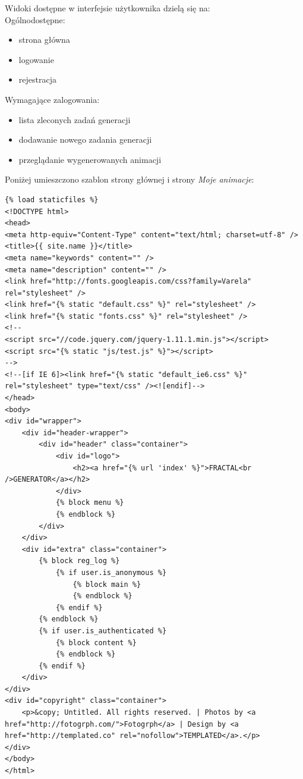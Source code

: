 \documentclass[a4paper]{article}
\begin{document}
Widoki dostępne w interfejsie użytkownika dzielą się na:\\
Ogólnodostępne:
\begin{itemize}
\item strona główna
\item logowanie
\item rejestracja
\end{itemize}
Wymagające zalogowania:
\begin{itemize}
\item lista zleconych zadań generacji
\item dodawanie nowego zadania generacji
\item przeglądanie wygenerowanych animacji
\end{itemize}
Poniżej umieszczono szablon strony głównej i strony \textit{Moje animacje}:

\begin{lstlisting}
{% load staticfiles %}
<!DOCTYPE html>
<head>
<meta http-equiv="Content-Type" content="text/html; charset=utf-8" />
<title>{{ site.name }}</title>
<meta name="keywords" content="" />
<meta name="description" content="" />
<link href="http://fonts.googleapis.com/css?family=Varela" rel="stylesheet" />
<link href="{% static "default.css" %}" rel="stylesheet" />
<link href="{% static "fonts.css" %}" rel="stylesheet" />
<!--
<script src="//code.jquery.com/jquery-1.11.1.min.js"></script>
<script src="{% static "js/test.js" %}"></script>
-->
<!--[if IE 6]><link href="{% static "default_ie6.css" %}" rel="stylesheet" type="text/css" /><![endif]-->
</head>
<body>
<div id="wrapper">
	<div id="header-wrapper">
		<div id="header" class="container">
			<div id="logo">
				<h2><a href="{% url 'index' %}">FRACTAL<br />GENERATOR</a></h2>
			</div>
            {% block menu %}
            {% endblock %}
		</div>
	</div>
	<div id="extra" class="container">
        {% block reg_log %}
            {% if user.is_anonymous %}
                {% block main %}
                {% endblock %}
            {% endif %}
        {% endblock %}
        {% if user.is_authenticated %}
		    {% block content %}
            {% endblock %}
        {% endif %}
	</div>
</div>
<div id="copyright" class="container">
	<p>&copy; Untitled. All rights reserved. | Photos by <a href="http://fotogrph.com/">Fotogrph</a> | Design by <a href="http://templated.co" rel="nofollow">TEMPLATED</a>.</p>
</div>
</body>
</html>
\end{lstlisting}
\end{document}
